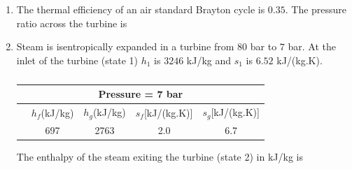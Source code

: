 \documentclass[a4paper,10pt]{article}
\begin{document}
\begin{enumerate}
    \item The thermal efficiency of an air standard Brayton cycle is $0.35$. The pressure ratio across the turbine is
    
    \hfill{}
    \begin{enumerate}
    \end{enumerate}

    \item Steam is isentropically expanded in a turbine from $80$ bar to $7$ bar. At the inlet of the turbine (state 1) $h_1$ is $3246$ kJ/kg and $s_1$ is $6.52$ kJ/(kg.K).
    \begin{table}[h!] \centering \caption*{} \label{tab:q19_thermo}
        \begin{tabular}{|l|c|c|c|c|} \hline
            \multicolumn{5}{|c|}{Pressure = 7 bar} \\ \hline
            & $h_f$(kJ/kg) & $h_g$(kJ/kg) & $s_f$[kJ/(kg.K)] & $s_g$[kJ/(kg.K)] \\ \hline
            & 697 & 2763 & 2.0 & 6.7 \\ \hline
        \end{tabular}
    \end{table}
    The enthalpy of the steam exiting the turbine (state 2) in kJ/kg is
    
    \hfill{}
    \begin{enumerate}
    \end{enumerate}


\end{enumerate}
\end{document}
